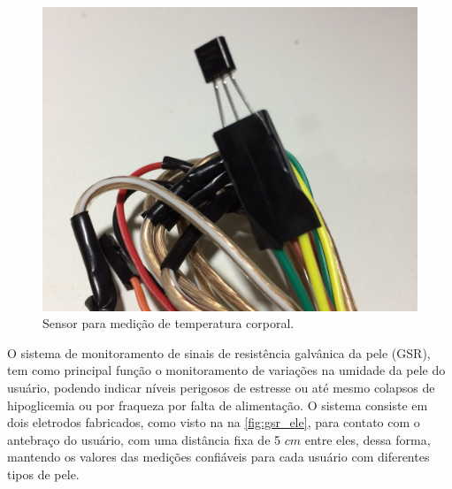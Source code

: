 \begin{figure}[h!]
    \begin{center}
        \includegraphics[scale=0.075]{figuras/temp_ele.jpg}
    \end{center}
    \caption{Sensor para medição de temperatura corporal.}
    \label{fig:temp_ele}
\end{figure}


O sistema de monitoramento de sinais de resistência galvânica da pele (GSR),
tem como principal função o monitoramento de variações na umidade da pele do
usuário, podendo indicar níveis perigosos de estresse ou até mesmo colapsos de
hipoglicemia ou por fraqueza por falta de alimentação. O sistema consiste em
dois eletrodos fabricados, como visto na na \ref{fig:gsr_ele}, para contato com o
antebraço do usuário, com uma distância fixa de 5 $cm$ entre eles, dessa forma,
mantendo os valores das medições confiáveis para cada usuário com diferentes tipos de pele.

